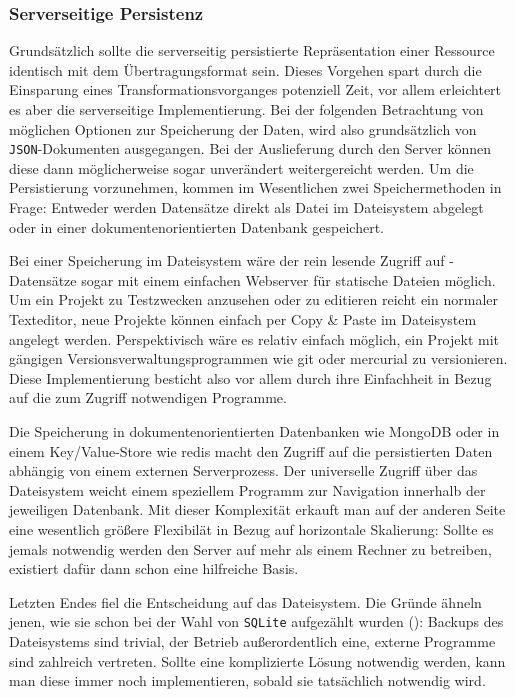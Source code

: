 \subsubsection{Serverseitige Persistenz}
\label{sec:implementation-persistence}

Grundsätzlich sollte die serverseitig persistierte Repräsentation einer Ressource identisch mit dem Übertragungsformat sein. Dieses Vorgehen spart durch die Einsparung eines Transformationsvorganges potenziell Zeit, vor allem erleichtert es aber die serverseitige Implementierung. Bei der folgenden Betrachtung von möglichen Optionen zur Speicherung der Daten, wird also grundsätzlich von \texttt{JSON}-Dokumenten ausgegangen. Bei der Auslieferung durch den Server können diese dann möglicherweise sogar unverändert weitergereicht werden. Um die Persistierung vorzunehmen, kommen im Wesentlichen zwei Speichermethoden in Frage: Entweder werden Datensätze direkt als Datei im Dateisystem abgelegt oder in einer dokumentenorientierten Datenbank gespeichert.

Bei einer Speicherung im Dateisystem wäre der rein lesende Zugriff auf \idename-Datensätze sogar mit einem einfachen Webserver für statische Dateien möglich. Um ein Projekt zu Testzwecken anzusehen oder zu editieren reicht ein normaler Texteditor, neue Projekte können einfach per Copy \& Paste im Dateisystem angelegt werden. Perspektivisch wäre es relativ einfach möglich, ein Projekt mit gängigen Versionsverwaltungsprogrammen wie git oder mercurial zu versionieren. Diese Implementierung besticht also vor allem durch ihre Einfachheit in Bezug auf die zum Zugriff notwendigen Programme.

Die Speicherung in dokumentenorientierten Datenbanken wie MongoDB oder in einem Key/Value-Store wie redis macht den Zugriff auf die persistierten Daten abhängig von einem externen Serverprozess. Der universelle Zugriff über das Dateisystem weicht einem speziellem Programm zur Navigation innerhalb der jeweiligen Datenbank. Mit dieser Komplexität erkauft man auf der anderen Seite eine wesentlich größere Flexibilät in Bezug auf horizontale Skalierung: Sollte es jemals notwendig werden den Server auf mehr als einem Rechner zu betreiben, existiert dafür dann schon eine hilfreiche Basis.

Letzten Endes fiel die Entscheidung auf das Dateisystem. Die Gründe ähneln jenen, wie sie schon bei der Wahl von \texttt{SQLite} aufgezählt wurden (): Backups des Dateisystems sind trivial, der Betrieb außerordentlich eine, externe Programme sind zahlreich vertreten. Sollte eine komplizierte Lösung notwendig werden, kann man diese immer noch implementieren, sobald sie tatsächlich notwendig wird.

